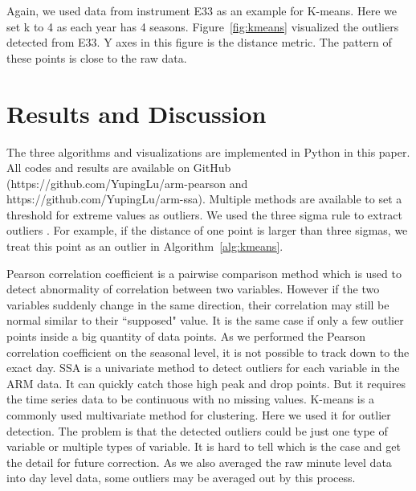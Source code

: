 \documentclass[letterpaper, 10 pt, conference]{ieeeconf}  %
\begin{document}
Again, we used data from instrument E33 as an example for K-means. Here we set k to 4 as each year has 4 seasons.  Figure~\ref{fig:kmeans} visualized the outliers detected from E33. Y axes in this figure is the distance metric. The pattern of these points is close to the raw data.

\section{Results and Discussion}
The three algorithms and visualizations are implemented in Python in this paper. All codes and results are available on GitHub (https://github.com/YupingLu/arm-pearson and https://github.com/YupingLu/arm-ssa). Multiple methods are available to set a threshold for extreme values as outliers. We used the three sigma rule to extract outliers \cite{pukelsheim1994three}. For example, if the distance of one point is larger than three sigmas, we treat this point as an outlier in Algorithm~\ref{alg:kmeans}.

Pearson correlation coefficient is a pairwise comparison method which is used to detect abnormality of correlation between two variables. However if the two variables suddenly change in the same direction, their correlation may still be normal similar to their ``supposed" value. It is the same case if only a few outlier points inside a big quantity of data points. As we performed the Pearson correlation coefficient on the seasonal level, it is not possible to track down to the exact day. SSA is a univariate method to detect outliers for each variable in the ARM data. It can quickly catch those high peak and drop points. But it requires the time series data to be continuous with no missing values. K-means is a commonly used multivariate method for clustering. Here we used it for outlier detection. The problem is that the detected outliers could be just one type of variable or multiple types of variable. It is hard to tell which is the case and get the detail for future correction. As we also averaged the raw minute level data into day level data, some outliers may be averaged out by this process.
\end{document}

